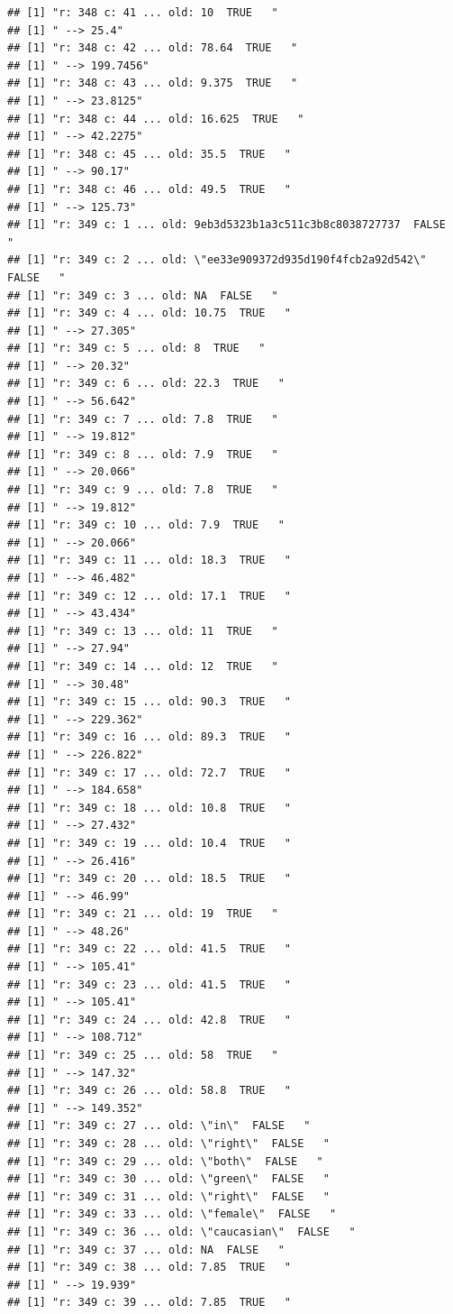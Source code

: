 \documentclass[]{article}
\begin{document}
\begin{verbatim}
## [1] "r: 348 c: 41 ... old: 10  TRUE   "
## [1] " --> 25.4"
## [1] "r: 348 c: 42 ... old: 78.64  TRUE   "
## [1] " --> 199.7456"
## [1] "r: 348 c: 43 ... old: 9.375  TRUE   "
## [1] " --> 23.8125"
## [1] "r: 348 c: 44 ... old: 16.625  TRUE   "
## [1] " --> 42.2275"
## [1] "r: 348 c: 45 ... old: 35.5  TRUE   "
## [1] " --> 90.17"
## [1] "r: 348 c: 46 ... old: 49.5  TRUE   "
## [1] " --> 125.73"
## [1] "r: 349 c: 1 ... old: 9eb3d5323b1a3c511c3b8c8038727737  FALSE   "
## [1] "r: 349 c: 2 ... old: \"ee33e909372d935d190f4fcb2a92d542\"  FALSE   "
## [1] "r: 349 c: 3 ... old: NA  FALSE   "
## [1] "r: 349 c: 4 ... old: 10.75  TRUE   "
## [1] " --> 27.305"
## [1] "r: 349 c: 5 ... old: 8  TRUE   "
## [1] " --> 20.32"
## [1] "r: 349 c: 6 ... old: 22.3  TRUE   "
## [1] " --> 56.642"
## [1] "r: 349 c: 7 ... old: 7.8  TRUE   "
## [1] " --> 19.812"
## [1] "r: 349 c: 8 ... old: 7.9  TRUE   "
## [1] " --> 20.066"
## [1] "r: 349 c: 9 ... old: 7.8  TRUE   "
## [1] " --> 19.812"
## [1] "r: 349 c: 10 ... old: 7.9  TRUE   "
## [1] " --> 20.066"
## [1] "r: 349 c: 11 ... old: 18.3  TRUE   "
## [1] " --> 46.482"
## [1] "r: 349 c: 12 ... old: 17.1  TRUE   "
## [1] " --> 43.434"
## [1] "r: 349 c: 13 ... old: 11  TRUE   "
## [1] " --> 27.94"
## [1] "r: 349 c: 14 ... old: 12  TRUE   "
## [1] " --> 30.48"
## [1] "r: 349 c: 15 ... old: 90.3  TRUE   "
## [1] " --> 229.362"
## [1] "r: 349 c: 16 ... old: 89.3  TRUE   "
## [1] " --> 226.822"
## [1] "r: 349 c: 17 ... old: 72.7  TRUE   "
## [1] " --> 184.658"
## [1] "r: 349 c: 18 ... old: 10.8  TRUE   "
## [1] " --> 27.432"
## [1] "r: 349 c: 19 ... old: 10.4  TRUE   "
## [1] " --> 26.416"
## [1] "r: 349 c: 20 ... old: 18.5  TRUE   "
## [1] " --> 46.99"
## [1] "r: 349 c: 21 ... old: 19  TRUE   "
## [1] " --> 48.26"
## [1] "r: 349 c: 22 ... old: 41.5  TRUE   "
## [1] " --> 105.41"
## [1] "r: 349 c: 23 ... old: 41.5  TRUE   "
## [1] " --> 105.41"
## [1] "r: 349 c: 24 ... old: 42.8  TRUE   "
## [1] " --> 108.712"
## [1] "r: 349 c: 25 ... old: 58  TRUE   "
## [1] " --> 147.32"
## [1] "r: 349 c: 26 ... old: 58.8  TRUE   "
## [1] " --> 149.352"
## [1] "r: 349 c: 27 ... old: \"in\"  FALSE   "
## [1] "r: 349 c: 28 ... old: \"right\"  FALSE   "
## [1] "r: 349 c: 29 ... old: \"both\"  FALSE   "
## [1] "r: 349 c: 30 ... old: \"green\"  FALSE   "
## [1] "r: 349 c: 31 ... old: \"right\"  FALSE   "
## [1] "r: 349 c: 33 ... old: \"female\"  FALSE   "
## [1] "r: 349 c: 36 ... old: \"caucasian\"  FALSE   "
## [1] "r: 349 c: 37 ... old: NA  FALSE   "
## [1] "r: 349 c: 38 ... old: 7.85  TRUE   "
## [1] " --> 19.939"
## [1] "r: 349 c: 39 ... old: 7.85  TRUE   "

\end{verbatim}
\end{document}
